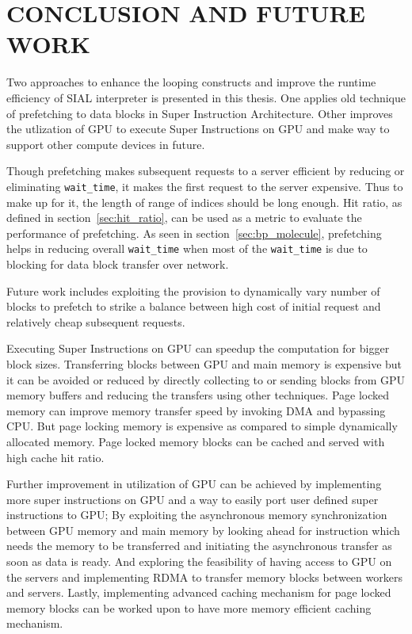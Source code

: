 \chapter{CONCLUSION AND FUTURE WORK}\label{conclusion}
Two approaches to enhance the looping constructs and improve the runtime efficiency
of SIAL interpreter is presented in this thesis. One applies old technique of
prefetching to data blocks in Super Instruction Architecture. Other improves
the utlization of GPU to execute Super Instructions on GPU and make way to support
other compute devices in future.

Though prefetching makes subsequent requests to a server efficient by reducing or
eliminating \texttt{wait\_time}, it makes the first request to the server expensive.
Thus to make up for it, the length of range of indices should be long enough. Hit
ratio, as defined in section~\ref{sec:hit_ratio}, can be used as a metric to evaluate
the performance of prefetching. As seen in section~\ref{sec:bp_molecule}, prefetching
helps in reducing overall \texttt{wait\_time} when most of the \texttt{wait\_time}
is due to blocking for data block transfer over network.

Future work includes exploiting the provision to dynamically vary number of blocks
to prefetch to strike a balance between high cost of initial request and relatively
cheap subsequent requests.

Executing Super Instructions on GPU can speedup the computation for bigger block
sizes. Transferring blocks between GPU and main memory is expensive but it can be
avoided or reduced by directly collecting to or sending blocks from GPU memory
buffers and reducing the transfers using other techniques. Page locked memory
can improve memory transfer speed by invoking DMA and bypassing CPU. But page locking
memory is expensive as compared to simple dynamically allocated memory. Page locked
memory blocks can be cached and served with high cache hit ratio.

Further improvement in utilization of GPU can be achieved by implementing more
super instructions on GPU and a way to easily port user defined super instructions
to GPU; By exploiting the asynchronous memory synchronization between GPU memory
and main memory by looking ahead for instruction which needs the memory
to be transferred and initiating the asynchronous transfer as soon as data is ready.
And exploring the feasibility of having access to GPU on the servers and implementing
RDMA to transfer memory blocks between workers and servers. Lastly, implementing
advanced caching mechanism for page locked memory blocks can be worked upon to have
more memory efficient caching mechanism.